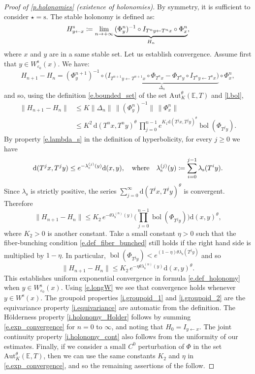 \documentclass[10pt]{amsart}
\def\vcentcolon{\mathrel{\mathop\ordinarycolon}}
\providecommand\ordinarycolon{:}
\providecommand*\coloneqq{\vcentcolon\mathrel{\mkern-1.2mu}=}
\theoremstyle{plain}
\theoremstyle{definition}
\newcommand{\EE}{\mathbb{E}}
\newcommand{\dd}{\mathrm{d}}
\renewcommand{\ss}{\mathrm{s}}
\newcommand{\Aut}{\mathrm{Aut}}
\DeclareMathOperator{\bol}{bol}
\let\epsilon\varepsilon
\begin{document}
\begin{proof}[Proof of \cref{p.holonomies} (existence of holonomies)]
By symmetry, it is sufficient to consider $\star = \ss$.
The stable holonomy is defined as:
\begin{equation}\label{e.def_holonomy}
H^\ss_{y \gets x} \coloneqq \lim_{n \to + \infty} \underbrace{(\Phi_y^n)^{-1} \circ I_{T^n y \gets T^n x} \circ \Phi_x^n}_{H_n},
\end{equation}
where $x$ and $y$ are in a same stable set.
Let us establish convergence.
Assume first that $y \in W^\ss_{\epsilon_0}(x)$.
We have:
\[
H_{n+1} - H_n = (\Phi_y^{n+1})^{-1} \circ \underbrace{\big( I_{T^{n+1} y \gets T^{n+1} x} \circ \Phi_{T^n x} - \Phi_{T^n y} \circ I_{T^n y \gets T^n x} \big)}_{\Delta_n} \circ \Phi_x^n,
\]
and so, using the definition \eqref{e.bounded_set} of the set $\Aut^\theta_K(\EE,T)$ and \cref{l.bol},
\begin{align*}
\|H_{n+1} - H_n\|
&\le K \|\Delta_n\| \, \| (\Phi_y^n)^{-1}\| \, \|\Phi_x^n\| \\
&\le K^2 \, \dd(T^n x, T^n y)^\theta \, \prod_{j=0}^{n-1} e^{K_1 \dd(T^j x, T^j y)^\theta} \bol(\Phi_{T^j y}).
\end{align*}
By property \eqref{e.lambda_s} in the definition of hyperbolicity, for every $j \ge 0$ we have
\[
\dd(T^j x, T^j y) \le e^{-\lambda_\ss^{(j)}(y)} \dd(x,y), \quad \text{where} \quad
\lambda_\ss^{(j)}(y) \coloneqq \sum_{i=0}^{j-1}\lambda_\ss(T^i y).
\]
Since $\lambda_\ss$ is strictly positive, the series $\sum_{j=0}^\infty \dd(T^j x, T^j y)^\theta$ is convergent.
Therefore
\[
\|H_{n+1} - H_n\|
\le K_2 \, e^{-\theta \lambda_\ss^{(n)}(y)} \biggl( \prod_{j=0}^{n-1} \bol(\Phi_{T^j y}) \biggr) \dd(x,y)^\theta,
\]
where $K_2>0$ is another constant.
Take a small constant $\eta>0$ such that the fiber-bunching condition \eqref{e.def_fiber_bunched} still holds if the right hand side is multiplied by $1-\eta$.
In particular, $\bol(\Phi_{T^j y}) < e^{(1-\eta)\theta\lambda_\ss(T^j y)}$ and so
\begin{equation}\label{e.exp_convergence}
\|H_{n+1} - H_n\|
\le K_2 \, e^{-\eta \theta \lambda_\ss^{(n)}(y)} \dd(x,y)^\theta.
\end{equation}
This establishes uniform exponential convergence in formula \eqref{e.def_holonomy} when $y \in W^\ss_{\epsilon_0}(x)$.
Using \eqref{e.longW} we see that convergence holds whenever $y \in W^\ss(x)$.
The groupoid properties \eqref{i.groupoid_1} and \eqref{i.groupoid_2} are the equivariance property \eqref{i.equivariance} are automatic from the definition.
The Hölderness property \eqref{i.holonomy_Holder} follows by summing \eqref{e.exp_convergence} for $n=0$ to $\infty$, and noting that $H_0 = I_{y\gets x}$.
The joint continuity property \eqref{i.holonomy_cont} also follows from the uniformity of our estimates.
Finally, if we consider a small $C^0$ perturbation of $\Phi$ in the set $\Aut^\theta_K(\EE,T)$, then we can use the same constants $K_2$ and $\eta$ in \eqref{e.exp_convergence}, and so the remaining assertions of the  follow.
\end{proof}
\end{document}
